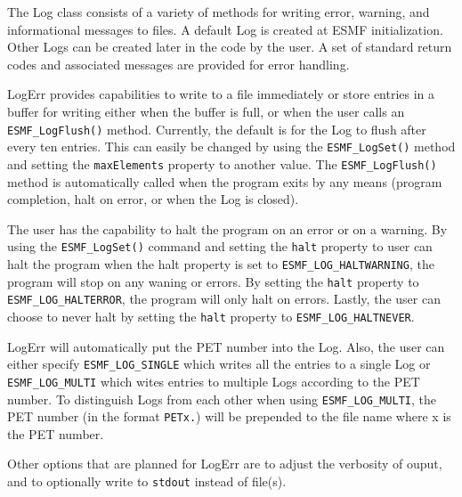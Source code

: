 



The Log class consists of a variety of methods for writing error, warning, and
informational messages to files.  A default Log is created at ESMF
initialization.  Other Logs can be created later in the code by the user.  A 
set of standard return codes and associated messages are provided for error 
handling.  

LogErr provides capabilities to write to a file immediately or store entries in
a buffer for writing either when the buffer is full, or when the user calls an 
{\tt ESMF\_LogFlush()} method.  Currently, the default is for the Log to flush
after every ten entries.  This can easily be changed by using the 
{\tt ESMF\_LogSet()} method and setting the {\tt maxElements} property to 
another value.  The {\tt ESMF\_LogFlush()} method is automatically called when 
the program exits by any means (program completion, halt on error, or when the
Log is closed).

The user has the capability to halt the program on an error or on a warning.
By using the {\tt ESMF\_LogSet()} command and setting the {\tt halt} property 
to user can halt the program when the halt property is set to 
{\tt ESMF\_LOG\_HALTWARNING}, the program will stop on any waning or errors.
By setting the {\tt halt} property to {\tt ESMF\_LOG\_HALTERROR}, the program 
will only halt on errors.  Lastly, the user can choose to never halt by setting
the {\tt halt} property to {\tt ESMF\_LOG\_HALTNEVER}.

LogErr will automatically put the PET number into the Log.  Also, the user can 
either specify {\tt ESMF\_LOG\_SINGLE} which writes all the entries to a single 
Log or {\tt ESMF\_LOG\_MULTI} which wites entries to multiple Logs according to 
the PET number.  To distinguish Logs from each other when using 
{\tt ESMF\_LOG\_MULTI}, the PET number (in the format {\tt PETx.}) will be 
prepended to the file name where x is the PET number.
 
Other options that are planned for LogErr are to adjust the verbosity of ouput, 
and to optionally write to {\tt stdout} instead of file(s).




